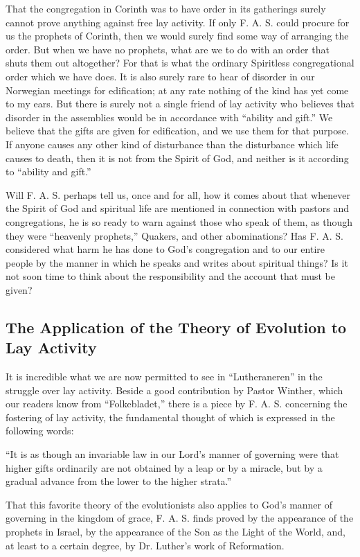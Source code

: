 That the congregation in Corinth was to have order in its gatherings surely cannot prove anything against free lay activity. If only F. A. S. could procure for us the prophets of Corinth, then we would surely find some way of arranging the order. But when we have no prophets, what are we to do with an order that shuts them out altogether? For that is what the ordinary Spiritless congregational order which we have does. It is also surely rare to hear of disorder in our Norwegian meetings for edification; at any rate nothing of the kind has yet come to my ears. But there is surely not a single friend of lay activity who believes that disorder in the assemblies would be in accordance with “ability and gift.” We believe that the gifts are given for edification, and we use them for that purpose. If anyone causes any other kind of disturbance than the disturbance which life causes to death, then it is not from the Spirit of God, and neither is it according to “ability and gift.”

Will F. A. S. perhaps tell us, once and for all, how it comes about that whenever the Spirit of God and spiritual life are mentioned in connection with pastors and congregations, he is so ready to warn against those who speak of them, as though they were “heavenly prophets,” Quakers, and other abominations? Has F. A. S. considered what harm he has done to God’s congregation and to our entire people by the manner in which he speaks and writes about spiritual things? Is it not soon time to think about the responsibility and the account that must be given?

\subsection{The Application of the Theory of Evolution to Lay Activity}

It is incredible what we are now permitted to see in “Lutheraneren” in the struggle over lay activity. Beside a good contribution by Pastor Winther, which our readers know from “Folkebladet,” there is a piece by F. A. S. concerning the fostering of lay activity, the fundamental thought of which is expressed in the following words:

“It is as though an invariable law in our Lord’s manner of governing were that higher gifts ordinarily are not obtained by a leap or by a miracle, but by a gradual advance from the lower to the higher strata.”

That this favorite theory of the evolutionists also applies to God’s manner of governing in the kingdom of grace, F. A. S. finds proved by the appearance of the prophets in Israel, by the appearance of the Son as the Light of the World, and, at least to a certain degree, by Dr. Luther’s work of Reformation.

